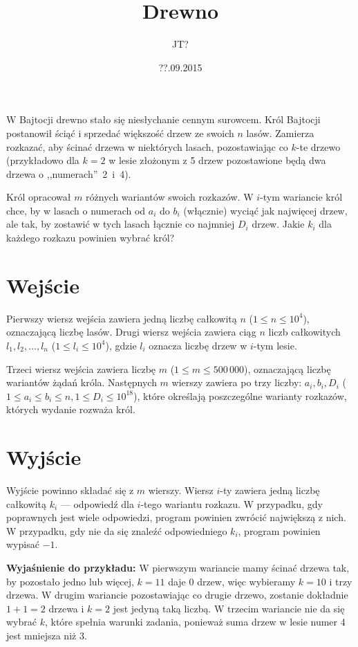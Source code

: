 \documentclass[zad,zawodnik,utf8]{sinol}
\title{Drewno}
\author{JT?}
\date{??.09.2015}
\begin{document}
  \begin{tasktext}%
W Bajtocji drewno stało się niesłychanie cennym surowcem. Król Bajtocji postanowił ściąć i sprzedać większość drzew ze swoich $n$ lasów. Zamierza rozkazać, aby ścinać drzewa w niektórych lasach, pozostawiając co $k$-te drzewo (przykładowo dla $k = 2$ w lesie złożonym z 5 drzew pozostawione będą dwa drzewa o ,,numerach''~2~i~4).

Król opracował $m$ różnych wariantów swoich rozkazów. W $i$-tym wariancie król chce, by w lasach o numerach od $a_i$ do $b_i$ (włącznie) wyciąć jak najwięcej drzew, ale tak, by zostawić w tych lasach łącznie co najmniej $D_i$ drzew. Jakie $k_i$ dla każdego rozkazu powinien wybrać król?

  \section{Wejście}
Pierwszy wiersz wejścia zawiera jedną liczbę całkowitą $n$ ($1 \leq n \leq 10^4$), oznaczającą liczbę lasów. Drugi wiersz wejścia zawiera ciąg $n$ liczb całkowitych $l_1, l_2, \ldots, l_n$ ($1 \leq l_i \leq 10^4$), gdzie $l_i$ oznacza liczbę drzew w $i$-tym lesie.

Trzeci wiersz wejścia zawiera liczbę $m$ ($1 \leq m \leq 500\,000$), oznaczającą liczbę wariantów żądań króla. Następnych $m$ wierszy zawiera po trzy liczby: $a_i, b_i, D_i$ ($1 \leq a_i \leq b_i \leq n, 1 \leq D_i \leq 10^{18}$), które określają poszczególne warianty rozkazów, których wydanie rozważa król.

  \section{Wyjście}
Wyjście powinno składać się z $m$ wierszy. Wiersz $i$-ty zawiera jedną liczbę całkowitą $k_i$ --- odpowiedź dla $i$-tego wariantu rozkazu. W przypadku, gdy poprawnych jest wiele odpowiedzi, program powinien zwrócić największą z nich. W przypadku, gdy nie da się znaleźć odpowiedniego $k_i$, program powinien wypisać $-1$.

     \makecompactexample

	\medskip
	\noindent
	\textbf{Wyjaśnienie do przykładu:} W pierwszym wariancie mamy ścinać drzewa tak, by pozostało jedno lub więcej, $k = 11$ daje $0$ drzew, więc wybieramy $k = 10$ i trzy drzewa. W drugim wariancie pozostawiając co drugie drzewo, zostanie dokładnie $1 + 1 = 2$ drzewa i $k = 2$ jest jedyną taką liczbą. W trzecim wariancie nie da się wybrać $k$, które spełnia warunki zadania, ponieważ suma drzew w lesie numer 4 jest mniejsza niż 3.

  \end{tasktext}
\end{document}
